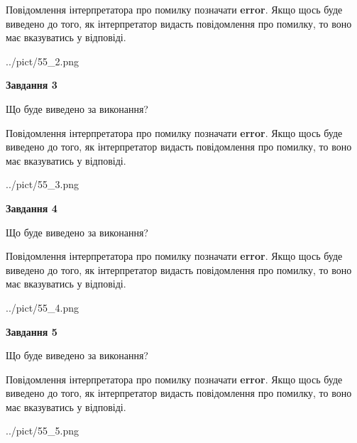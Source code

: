 \documentclass[12pt, ukrainian]{article}
\begin{document}
{\begin {large}
Повідомлення інтерпретатора про помилку позначати \textbf{error}.
Якщо щось буде виведено до того, як інтерпретатор видасть повідомлення про помилку, 
то воно має вказуватись у відповіді. \par


\begin{center}
	{../pict/55_2.png}
\end{center}
\newpage

{\begin {center}\textbf{Завдання 3}\end {center}}\par
Що буде виведено за виконання?

Повідомлення інтерпретатора про помилку позначати \textbf{error}.
Якщо щось буде виведено до того, як інтерпретатор видасть повідомлення про помилку, 
то воно має вказуватись у відповіді. \par


\begin{center}
	{../pict/55_3.png}
\end{center}
\newpage

{\begin {center}\textbf{Завдання 4}\end {center}}\par
Що буде виведено за виконання?

Повідомлення інтерпретатора про помилку позначати \textbf{error}.
Якщо щось буде виведено до того, як інтерпретатор видасть повідомлення про помилку, 
то воно має вказуватись у відповіді. \par


\begin{center}
	{../pict/55_4.png}
\end{center}
\newpage

{\begin {center}\textbf{Завдання 5}\end {center}}\par
Що буде виведено за виконання?

Повідомлення інтерпретатора про помилку позначати \textbf{error}.
Якщо щось буде виведено до того, як інтерпретатор видасть повідомлення про помилку, 
то воно має вказуватись у відповіді. \par


\begin{center}
	{../pict/55_5.png}
\end{center}
\newpage


\end{large}}
\end{document}
